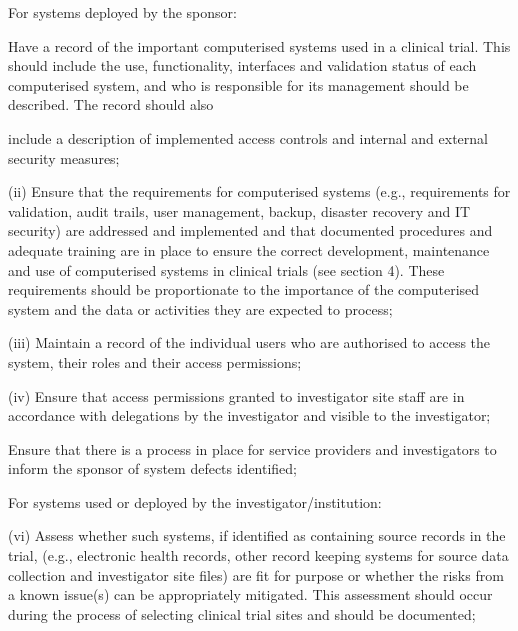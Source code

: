 \documentclass[11pt]{article}
\begin{document}
For systems deployed by the sponsor:


\begin{description}[leftmargin=2.5cm,style=sameline]

\item[(i)] Have a record of the important computerised systems used in a clinical trial. This should include the use, functionality, interfaces and validation status of each computerised system, and who is responsible for its management should be described. The record should also

\end{description}

include a description of implemented access controls and internal and external security measures;


(ii) Ensure that the requirements for computerised systems (e.g., requirements for validation, audit trails, user management, backup, disaster recovery and IT security) are addressed and implemented and that documented procedures and adequate training are in place to ensure the correct development, maintenance and use of computerised systems in clinical trials (see section 4). These requirements should be proportionate to the importance of the computerised system and the data or activities they are expected to process;


(iii) Maintain a record of the individual users who are authorised to access the system, their roles and their access permissions;


(iv) Ensure that access permissions granted to investigator site staff are in accordance with delegations by the investigator and visible to the investigator;


\begin{description}[leftmargin=2.5cm,style=sameline]

\item[(v)] Ensure that there is a process in place for service providers and investigators to inform the sponsor of system defects identified;

\end{description}

For systems used or deployed by the investigator/institution:


(vi) Assess whether such systems, if identified as containing source records in the trial, (e.g., electronic health records, other record keeping systems for source data collection and investigator site files) are fit for purpose or whether the risks from a known issue(s) can be appropriately mitigated. This assessment should occur during the process of selecting clinical trial sites and should be documented;
\end{document}
